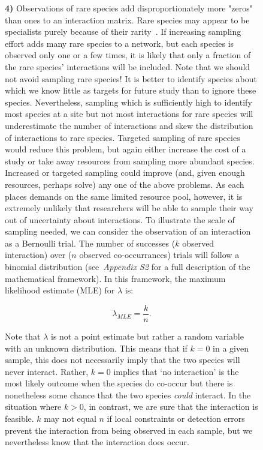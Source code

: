 \documentclass[12pt]{article}
\begin{document}
\begin{figure}[h!]
{\textbf{4)}{} Observations of rare species add disproportionately more "zeros" than ones to an interaction matrix. Rare species may appear to be specialists purely because of their rarity~\citep{}. If increasing sampling effort adds many rare species to a network, but each species is observed only one or a few times, it is likely that only a fraction of the rare species' interactions will be included. Note that we should not avoid sampling rare species! It is better to identify species about which we know little as targets for future study than to ignore these species. Nevertheless, sampling which is sufficiently high to identify most species at a site but not most interactions for rare species will underestimate the number of interactions and skew the distribution of interactions to rare species. Targeted sampling of rare species would reduce this problem, but again either increase the cost of a study or take away resources from sampling more abundant species. \\
Increased or targeted sampling could improve (and, given enough resources, perhaps solve) any one of the above problems. As each places demands on the same limited resource pool, however, it is extremely unlikely that researchers will be able to sample their way out of uncertainty about interactions. To illustrate the scale of sampling needed, we can consider the observation of an interaction as a Bernoulli trial. The number of successes ($k$ observed interaction) over ($n$ observed co-occurrances) trials will follow a binomial distribution (see~\emph{Appendix S2} for a full description of the mathematical framework). In this framework, the maximum likelihood estimate (MLE) for $\lambda$ is:

        \begin{equation}
          \lambda_{MLE} = \frac{k}{n}  .
          \label{theta_MLE}
        \end{equation}
  

    Note that $\lambda$ is not a point estimate but rather a random variable with an unknown distribution. This means that if $k = 0$ in a given sample, this does not necessarily imply that the two species will never interact. Rather, $k = 0$ implies that `no interaction' is the most likely outcome when the species do co-occur but there is nonetheless some chance that the two species \emph{could} interact. In the situation where $k>0$, in contrast, we are sure that the interaction is feasible. $k$ may not equal $n$ if local constraints or detection errors prevent the interaction from being observed in each sample, but we nevertheless know that the interaction does occur.

}
\end{figure}
\end{document}
